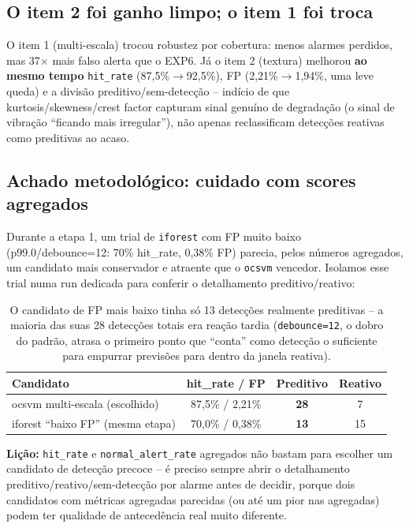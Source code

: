 \documentclass[11pt,a4paper]{article}
\begin{document}
\subsection{O item 2 foi ganho limpo; o item 1 foi troca}

O item 1 (multi-escala) trocou robustez por cobertura: menos alarmes
perdidos, mas 37$\times$ mais falso alerta que o EXP6. Já o item 2
(textura) melhorou \textbf{ao mesmo tempo} \texttt{hit\_rate}
(87,5\%$\to$92,5\%), FP (2,21\%$\to$1,94\%, uma leve queda) e a divisão
preditivo/sem-detecção -- indício de que kurtosis/skewness/crest factor
capturam sinal genuíno de degradação (o sinal de vibração ``ficando mais
irregular''), não apenas reclassificam detecções reativas como preditivas
ao acaso.

\subsection{Achado metodológico: cuidado com scores agregados}
\label{sec:licao}

Durante a etapa 1, um trial de \texttt{iforest} com FP muito baixo
(p99.0/debounce=12: 70\% hit\_rate, 0,38\% FP) parecia, pelos números
agregados, um candidato mais conservador e atraente que o \texttt{ocsvm}
vencedor. Isolamos esse trial numa run dedicada para conferir o
detalhamento preditivo/reativo:

\begin{table}[H]
\centering
\begin{tabular}{@{}lccc@{}}
\toprule
\textbf{Candidato} & \textbf{hit\_rate / FP} & \textbf{Preditivo} & \textbf{Reativo} \\
\midrule
ocsvm multi-escala (escolhido) & 87,5\% / 2,21\% & \textbf{28} & 7 \\
iforest ``baixo FP'' (mesma etapa) & 70,0\% / 0,38\% & \textbf{13} & 15 \\
\bottomrule
\end{tabular}
\caption{O candidato de FP mais baixo tinha só 13 detecções realmente
preditivas -- a maioria das suas 28 detecções totais era reação tardia
(\texttt{debounce=12}, o dobro do padrão, atrasa o primeiro ponto que
``conta'' como detecção o suficiente para empurrar previsões para dentro da
janela reativa).}
\end{table}

\textbf{Lição:} \texttt{hit\_rate} e \texttt{normal\_alert\_rate} agregados
não bastam para escolher um candidato de detecção precoce -- é preciso
sempre abrir o detalhamento preditivo/reativo/sem-detecção por alarme antes
de decidir, porque dois candidatos com métricas agregadas parecidas (ou até
um pior nas agregadas) podem ter qualidade de antecedência real muito
diferente.
\end{document}
